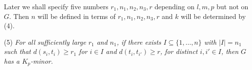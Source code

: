 Later we shall specify five numbers $r_1, n_1, n_2, n_3, r$ depending on $l, m, p$ but not on $G$. Then $n$ will be defined in terms of $r_1, n_1, n_2, n_3, r$ and $k$ will be determined by (4).

\hspace*{12pt}(5) \textit{For all sufficiently large $r_1$ and $n_1$, if there exists $I \subseteq \{1, \dots, n\}$ with $|I| = n_1$ such that $d(s_i, t_i) \ge r_1$ for $i \in I$ and $d(t_i, t_{i'}) \ge r$, for distinct $i, i' \in I$, then $G$ has a $K_p$-minor.}

